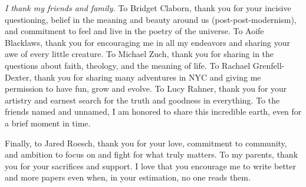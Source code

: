 \textit{I thank my friends and family.} To Bridget Claborn, thank you for your
incisive questioning, belief in the meaning and beauty around us
(post-post-modernism), and commitment to feel and live in the poetry of the
universe. To Aoife Blacklaws, thank you for encouraging me in all my
endeavors and sharing your awe of every little creature. To Michael Zuch,
thank you for sharing in the questions about faith, theology, and the
meaning of life. To Rachael Grenfell-Dexter, thank you for sharing many
adventures in NYC and giving me permission to have fun, grow and evolve. To
Lucy Rahner, thank you for your artistry and earnest search for the truth
and goodness in everything. To the friends named and unnamed, I am honored
to share this incredible earth, even for a brief moment in time. %

Finally, to Jared Roesch, thank you for your love, commitment to community,
and ambition to focus on and fight for what truly matters. To my parents,
thank you for your sacrifices and support. I love that you
encourage me to write better and more papers even when, in your estimation,
no one reads them.
















